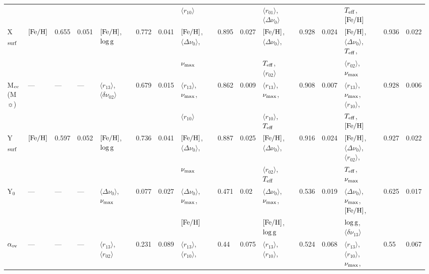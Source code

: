 {\begin{landscape}
\begin{table}
\begin{tabular}{  l | l  l  l | l  l  l  l | l  l  l  l | l  l  l  l | l  l  l  l   }
  &  &  &  &  &  &  &  &  $\langle r_{10}\rangle$ &  &  &  & $\langle r_{01}\rangle$, $\langle\Delta\nu_0\rangle$ &&  & & $T_{\rm{eff}}$, $[\rm{Fe/H}]$ &  &  &\\[3pt] 
   X$_{\rm{surf}}$ & $[\rm{Fe/H}]$ & 0.655 & 0.051 & $[\rm{Fe/H}]$, $\log \rm{g}$ && 0.772 & 0.041 & $[\rm{Fe/H}]$, $\langle\Delta\nu_0\rangle$, && 0.895 & 0.027 & $[\rm{Fe/H}]$, $\langle\Delta\nu_0\rangle$, && 0.928 & 0.024 & $[\rm{Fe/H}]$, $\langle\Delta\nu_0\rangle$, $T_{\rm{eff}}$, && 0.936 & 0.022\\
  &  &  &  &  &  &  &  &  $\nu_{\rm{max}}$ &  &  &  & $T_{\rm{eff}}$, $\langle r_{02}\rangle$ &&  & & $\langle r_{02}\rangle$, $\nu_{\rm{max}}$ &  &  &\\[3pt] 
  M$_{\rm{cc}}$ (M$\sun$)& --- & --- & --- & $\langle r_{13}\rangle$, $\langle\delta\nu_{02}\rangle$ && 0.679 & 0.015 & $\langle r_{13}\rangle$, $\nu_{\rm{max}}$, & &0.862 & 0.009 & $\langle r_{13}\rangle$, $\nu_{\rm{max}}$, && 0.908 & 0.007 & $\langle r_{13}\rangle$, $\nu_{\rm{max}}$, $\langle r_{10}\rangle$, && 0.928 & 0.006\\
  &  &  &  &  &  &  &  &  $\langle r_{10}\rangle$ &  &  &  & $\langle r_{10}\rangle$, $T_{\rm{eff}}$ &&  & & $T_{\rm{eff}}$, $[\rm{Fe/H}]$ &  &  &\\[3pt]
   Y$_{\rm{surf}}$ & $[\rm{Fe/H}]$ & 0.597 & 0.052 & $[\rm{Fe/H}]$, $\log \rm{g}$ && 0.736 & 0.041 & $[\rm{Fe/H}]$, $\langle\Delta\nu_0\rangle$, && 0.887 & 0.025 & $[\rm{Fe/H}]$, $\langle\Delta\nu_0\rangle$, && 0.916 & 0.024 & $[\rm{Fe/H}]$, $\langle\Delta\nu_0\rangle$, $\langle r_{02}\rangle$, && 0.927 & 0.022\\
  &  &  &  &  &  &  &  &  $\nu_{\rm{max}}$ &  &  &  & $\langle r_{02}\rangle$, $T_{\rm{eff}}$ &&  & & $T_{\rm{eff}}$, $\nu_{\rm{max}}$ &  &  &\\[3pt] 
   Y$_0$ & --- & --- & --- & $\langle\Delta\nu_0\rangle$, $\nu_{\rm{max}}$ && 0.077 & 0.027 & $\langle\Delta\nu_0\rangle$, $\nu_{\rm{max}}$, && 0.471 & 0.02 & $\langle\Delta\nu_0\rangle$, $\nu_{\rm{max}}$, && 0.536 & 0.019 & $\langle\Delta\nu_0\rangle$, $\nu_{\rm{max}}$, $[\rm{Fe/H}]$, && 0.625 & 0.017\\
  &  &  &  &  &  &  &  &  $[\rm{Fe/H}]$ &  &  &  & $[\rm{Fe/H}]$, $\log \rm{g}$ &&  & & $\log \rm{g}$, $\langle\delta\nu_{13}\rangle$ &  &  &\\[3pt] 
    $\alpha_{\rm{ov}}$ & --- & --- & --- & $\langle r_{13}\rangle$, $\langle r_{02}\rangle$ && 0.231 & 0.089 & $\langle r_{13}\rangle$, $\langle r_{10}\rangle$, && 0.44 & 0.075 & $\langle r_{13}\rangle$,  $\langle r_{10}\rangle$, && 0.524 & 0.068 & $\langle r_{13}\rangle$, $\langle r_{10}\rangle$, $\nu_{\rm{max}}$, && 0.55 & 0.067\\

\end{tabular}
\end{table}
\end{landscape}}
